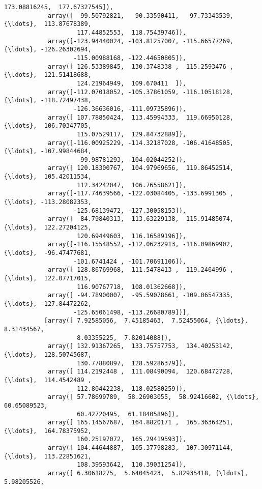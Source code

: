 \documentclass[11pt]{article}
\begin{document}
\begin{Verbatim}[commandchars=\\\{\}]
                    173.08816245,  177.67327545]),
            array([  99.50792821,   90.33590411,   97.73343539, {\ldots},  113.87678389,
                    117.44852553,  118.75439746]),
            array([-123.94440024, -103.81257007, -115.66577269, {\ldots}, -126.26302694,
                   -115.00988168, -122.44650805]),
            array([ 126.53389845,  130.3748338 ,  115.2593476 , {\ldots},  121.51418688,
                    124.21964949,  109.670411  ]),
            array([-112.07018052, -105.37861059, -116.10518128, {\ldots}, -118.72497438,
                   -126.36636016, -111.09735896]),
            array([ 107.78850424,  113.45994333,  119.66950128, {\ldots},  106.70347705,
                    115.07529117,  129.84732889]),
            array([-116.00925229, -114.32187028, -106.41648505, {\ldots}, -107.99844684,
                    -99.98781293, -104.02044252]),
            array([ 120.18300767,  104.97969656,  119.86452514, {\ldots},  105.42011534,
                    112.34242047,  106.76558621]),
            array([-117.74639566, -122.03084405, -133.6991305 , {\ldots}, -113.28082353,
                   -125.68139472, -127.30058153]),
            array([  84.79840313,  113.63229138,  115.91485074, {\ldots},  122.27204125,
                    120.69449603,  116.16589196]),
            array([-116.15548552, -112.06232913, -116.09869902, {\ldots},  -96.47477681,
                   -101.6741424 , -101.70691106]),
            array([ 128.86769968,  111.5478413 ,  119.2464996 , {\ldots},  122.07717015,
                    116.90767718,  108.01362668]),
            array([ -94.78900007,  -95.59078661, -109.06547335, {\ldots}, -127.84472262,
                   -125.65061498, -113.26680789])],
           [array([ 7.92585056,  7.45185463,  7.52455064, {\ldots},  8.31434567,
                    8.03355225,  7.82014088]),
            array([ 132.91367265,  133.75757753,  134.40253142, {\ldots},  128.50745687,
                    130.77880897,  128.59286379]),
            array([ 114.2192448 ,  111.08490094,  120.68472728, {\ldots},  114.4542489 ,
                    112.80442238,  118.02580259]),
            array([ 57.78699789,  58.26903055,  58.92416602, {\ldots},  60.65089523,
                    60.42720495,  61.18405896]),
            array([ 165.14567687,  164.8820171 ,  165.36364251, {\ldots},  164.78375952,
                    160.25197072,  165.29419593]),
            array([ 104.44644887,  105.37798283,  107.30971144, {\ldots},  113.22851621,
                    108.39593642,  110.39031254]),
            array([ 6.30618275,  5.64045423,  5.82935418, {\ldots},  5.98205526,

\end{Verbatim}
\end{document}
